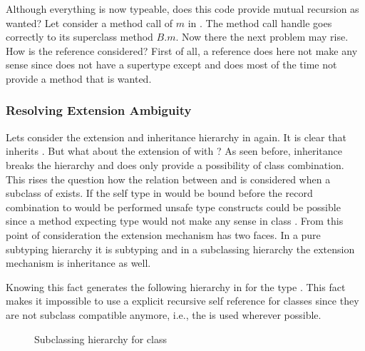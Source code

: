 Although everything is now typeable, does this code provide mutual
recursion as wanted?  Let consider a method call of $m$ in \C. The
method call handle goes correctly to its superclass method $B.m$. Now
there the next problem may rise. How is the \base reference considered?
First of all, a \base reference does here not make any sense since
\C does not have a supertype except \object and \object does most 
of the time not provide a method that is wanted.

\subsubsection{Resolving Extension Ambiguity}
\label{sec:resolveAmbiguity}
Lets consider the extension and inheritance hierarchy in 
again. It is clear that \C inherits \B. But what about the extension of \A 
with \B? As seen before, inheritance breaks the hierarchy and does only
provide a possibility of class combination. This rises the question how the 
relation between \A and \B is considered when a subclass of \B exists. If
the self type in \A would be bound before the record combination to
\C would be performed unsafe type constructs could be possible since a
method expecting type \A would not make any sense in class \C. From this
point of consideration the extension mechanism has two faces. In a pure
subtyping hierarchy it is subtyping and in a subclassing hierarchy the
extension mechanism is inheritance as well.

Knowing this fact generates the following hierarchy in
 for the type \C. This fact makes it impossible
to use a explicit recursive self reference for classes since they are not
subclass compatible anymore, i.e., the \mytype is used wherever possible.

\begin{figure}[ht]
	\centering
	\caption{Subclassing hierarchy for class \C}
	\label{fig:fixedHierarchy}
\end{figure}
%

